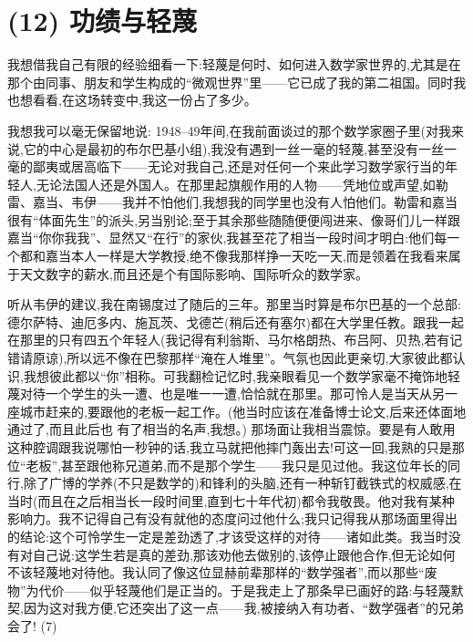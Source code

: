 \section{(12) 功绩与轻蔑}

我想借我自己有限的经验细看一下:轻蔑是何时、如何进入数学家世界的,尤其是在那个由同事、朋友和学生构成的“微观世界”里——它已成了我的第二祖国。同时我也想看看,在这场转变中,我这一份占了多少。

我想我可以毫无保留地说: 1948–49年间,在我前面谈过的那个数学家圈子里(对我来说,它的中心是最初的布尔巴基小组),我没有遇到一丝一毫的轻蔑,甚至没有一丝一毫的鄙夷或居高临下——无论对我自己,还是对任何一个来此学习数学家行当的年轻人,无论法国人还是外国人。在那里起旗舰作用的人物——凭地位或声望,如勒雷、嘉当、韦伊——我并不怕他们,我想我的同学里也没有人怕他们。勒雷和嘉当很有“体面先生”的派头,另当别论;至于其余那些随随便便闯进来、像哥们儿一样跟嘉当“你你我我”、显然又“在行”的家伙,我甚至花了相当一段时间才明白:他们每一个都和嘉当本人一样是大学教授,绝不像我那样挣一天吃一天,而是领着在我看来属于天文数字的薪水,而且还是个有国际影响、国际听众的数学家。

听从韦伊的建议,我在南锡度过了随后的三年。那里当时算是布尔巴基的一个总部:德尔萨特、迪厄多内、施瓦茨、戈德芒(稍后还有塞尔)都在大学里任教。跟我一起在那里的只有四五个年轻人(我记得有利翁斯、马尔格朗热、布吕阿、贝热,若有记错请原谅),所以远不像在巴黎那样“淹在人堆里”。气氛也因此更亲切,大家彼此都认识,我想彼此都以“你”相称。可我翻检记忆时,我亲眼看见一个数学家毫不掩饰地轻蔑对待一个学生的头一遭、也是唯一一遭,恰恰就在那里。那可怜人是当天从另一座城市赶来的,要跟他的老板一起工作。(他当时应该在准备博士论文,后来还体面地通过了,而且此后也
有了相当的名声,我想。) 那场面让我相当震惊。要是有人敢用这种腔调跟我说哪怕一秒钟的话,我立马就把他摔门轰出去!可这一回,我熟的只是那位“老板”,甚至跟他称兄道弟,而不是那个学生——我只是见过他。我这位年长的同行,除了广博的学养(不只是数学的)和锋利的头脑,还有一种斩钉截铁式的权威感,在当时(而且在之后相当长一段时间里,直到七十年代初)都令我敬畏。他对我有某种影响力。我不记得自己有没有就他的态度问过他什么;我只记得我从那场面里得出的结论:这个可怜学生一定是差劲透了,才该受这样的对待——诸如此类。我当时没有对自己说:这学生若是真的差劲,那该劝他去做别的,该停止跟他合作,但无论如何不该轻蔑地对待他。我认同了像这位显赫前辈那样的“数学强者”,而以那些“废物”为代价——似乎轻蔑他们是正当的。于是我走上了那条早已画好的路:与轻蔑默契,因为这对我方便,它还突出了这一点——我,被接纳入有功者、“数学强者”的兄弟会了! (7)

